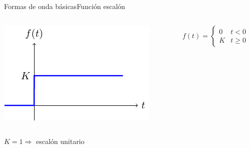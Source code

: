 \documentclass[aspectratio=169, xcolor={usenames,svgnames,dvipsnames}]{beamer}
\begin{document}
\begin{frame}{Formas de onda básicas}{Función escalón}
\begin{columns}
\begin{column}{0.5\columnwidth}
\begin{center}
\includegraphics[width=.9\linewidth]{../figs/escalon.pdf}
\end{center}
\end{column}

\begin{column}{0.5\columnwidth}
\[
  f(t) = %
  \begin{cases}
    0 & t < 0\\
    K & t \geq 0
  \end{cases}
  \]
\end{column}
\end{columns}
$K=1\Rightarrow$ escalón unitario
\end{frame}
\end{document}
